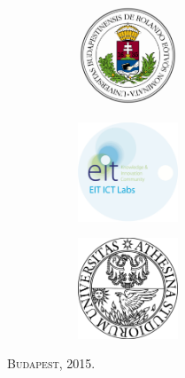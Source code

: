 \documentclass[a4paper,12pt,times,numbered,print,index]{Classes/PhDThesisPSnPDF}
\begin{document}
\begin{titlepage}
\begin{center}
\begin{minipage}{0.37\textwidth}
\begin{flushleft}
		\end{flushleft}
	\end{minipage}
	
		\begin{figure}[h!]
			\begin{subfigure}{0.32\textwidth}
				\centering
				\includegraphics[width=3cm]{Figs/ELTE_logo.png}
			\end{subfigure}
			\begin{subfigure}{0.32\textwidth}
				\centering
				\includegraphics[width=3cm]{Figs/EIT-ICT-Labs-Logo.png}
			\end{subfigure}
			\begin{subfigure}{0.32\textwidth}
				\centering			\includegraphics[width=3cm]{Figs/UNITN_logo.png}
			\end{subfigure}%
		\end{figure}
		\textbf{} 
		
	
			\textsc{{\large Budapest, 2015.}}\\[3cm] 
		
		\vfill
	\end{center}
	
\end{titlepage}
\end{document}
